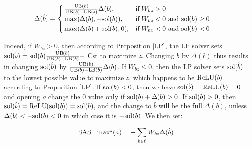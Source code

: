 	\begin{align*}
		&\Delta(\hat{b}) =
		\begin{cases}
			\frac{\mathrm{UB}(b)}{\mathrm{UB}(b)-\mathrm{LB}(b)}\Delta(b),  &\text{if }W_{bz} > 0\\
			\max(\Delta(b),-\mathrm{sol}(b)),  &\text{if }  W_{bz} < 0 \text{ and } \mathrm{sol}(b)\geq0\\
			\max(\Delta(b)+\mathrm{sol}(b),0),  &\text{if }  W_{bz} < 0 \text{ and } \mathrm{sol}(b)<0		 
		\end{cases}
		\end{align*}


Indeed, if $W_{bz}>0$, then according to Proposition \ref{LP}, the LP solver
sets $\mathrm{sol}(\hat{b}) = \mathrm{sol}(b) \frac{\mathrm{UB}(b)}{\mathrm{UB}(b)-\mathrm{LB}(b)} +$ Cst to maximize $z$.
Changing $b$ by $\Delta(b)$ thus results in changing $\mathrm{sol}(\hat{b})$ by 
$\frac{\mathrm{UB}(b)}{\mathrm{UB}(b)-\mathrm{LB}(b)}\Delta(b)$.
If $W_{bz}\leq0$, then the LP solver sets $\mathrm{sol}(\hat{b})$ to the lowest possible value to maximize $z$, which happens to be $\mathrm{ReLU}(b)$ according to Proposition \ref{LP}.
If $\mathrm{sol}(b) < 0$, then we have $\mathrm{sol}(\hat{b})=\mathrm{ReLU}(b)=0$ and opening $a$ change the 0 value only if $\mathrm{sol}(b)+\Delta(b)>0$. If $\mathrm{sol}(b) > 0$, then 
$\mathrm{sol}(\hat{b})=\mathrm{ReLU}(\mathrm{sol}(b))=\mathrm{sol}(b)$, and the change to $\hat{b}$ will be 
the full $\Delta(b)$, unless $\Delta(b) < -\mathrm{sol}(b) < 0$ in which case it is 
$-\mathrm{sol}(b)$. We then set:


$$ \mathrm{SAS}\_\max\nolimits^z(a) = -\sum_{b \in \ell} W_{bz} \Delta(\hat{b})$$
\fi


\iffalse
While $\Utility$ is a priori a more accurate way to select neurons to open in partial MILP (that will be verified in Fig. \ref{fig_table3}), global scoring functions have two advantages: first, they are faster to compute (a unique backpropagation is sufficient, while SAS needs one LP call to recover the solution, plus a forward propagation for each node $a$). This is not an issue for selecting nodes for partial MILP, as there is a single selection step. This would be potentially problematic for choosing branching nodes in BaB, at each branch. A trade off could be to precompute FSB and only on the most promising nodes run $\Utility$. The second shortcoming is the other side of the coin to consider improvement local to a solution: in the case of branching, one of the branch imposes to be far from the solution and $\Utility$ is not accurate on that branch, while global scoring is as (in)accurate for both branches. We will verify that using GS for ordering nodes after the SAS selection is actually more efficient, for this very reason.
\fi

